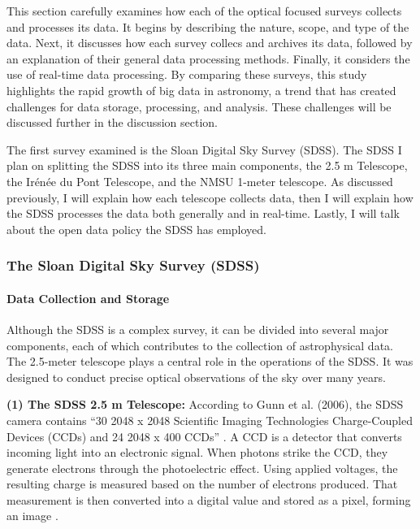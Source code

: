 \documentclass[preprint,linenumbers, longauthor]{aastex631}
\begin{document}
This section carefully examines how each of the optical focused surveys collects and processes its data. 
It begins by describing the nature, scope, and type of the data. 
Next, it discusses how each survey collecs and archives its data, followed by an explanation of their general data processing methods. 
Finally, it considers the use of real-time data processing. 
By comparing these surveys, this study highlights the rapid growth of big data in astronomy, a trend that has created challenges for data storage, processing, and analysis. 
These challenges will be discussed further in the discussion section.

The first survey examined is the Sloan Digital Sky Survey (SDSS). The SDSS I plan on splitting  the SDSS into its three main components, the 2.5 m Telescope, the Irénée du Pont Telescope, and the NMSU 1-meter telescope.
As discussed previously, I will explain how each telescope collects data, then I will explain how the SDSS processes the data both generally and in real-time. 
Lastly, I will talk about the open data policy the SDSS has employed.


\subsubsection{The Sloan Digital Sky Survey (SDSS)}
\paragraph{Data Collection and Storage} 
Although the SDSS is a complex survey, it can be divided into several major components, each of which contributes to the collection of astrophysical data.
The 2.5-meter telescope plays a central role in the operations of the SDSS. It was designed to conduct precise optical observations of the sky over many years. 


\textbf{(1) The SDSS 2.5 m Telescope:}  
According to Gunn et al. (2006), the SDSS camera contains “30 2048 x 2048 Scientific Imaging Technologies Charge-Coupled Devices (CCDs) and 24 2048 x 400 CCDs” \cite{gunn25TelescopeSloan2006}. 
A CCD is a detector that converts incoming light into an electronic signal. 
When photons strike the CCD, they generate electrons through the photoelectric effect. 
Using applied voltages, the resulting charge is measured based on the number of electrons produced. 
That measurement is then converted into a digital value and stored as a pixel, forming an image \cite{lesserSummaryChargeCoupledDevices2015}.
\end{document}
